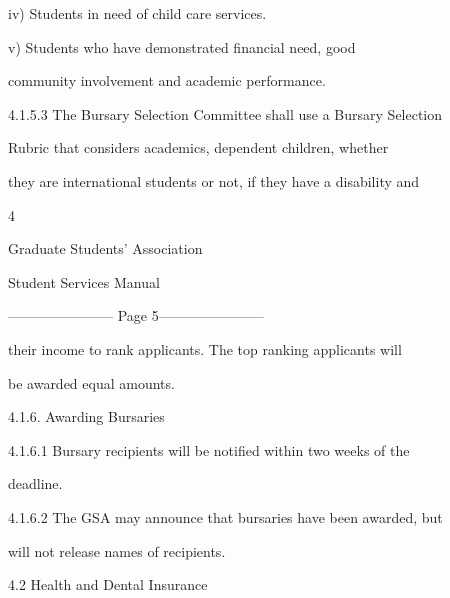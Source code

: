          iv)     Students in need of child care services.  



         v)      Students who have   demonstrated financial need, good  

         community involvement and academic performance.  



  



4.1.5.3       The  Bursary  Selection  Committee  shall  use  a  Bursary  Selection  

              Rubric  that  considers  academics,  dependent  children,  whether  

              they are international students or not, if they have a disability and  



                                                 4  



                                   Graduate Students’ Association  



                                        Student Services Manual  



  


----------------------- Page 5-----------------------

               their  income  to  rank  applicants.  The  top  ranking  applicants  will  

               be awarded equal amounts.   



4.1.6. Awarding Bursaries  



  4.1.6.1      Bursary  recipients  will  be  notified  within  two  weeks  of  the  

               deadline.   



  4.1.6.2      The  GSA  may  announce  that  bursaries  have  been  awarded,  but  

               will not release names of recipients.   



  



                      4.2      Health and Dental Insurance   



  



